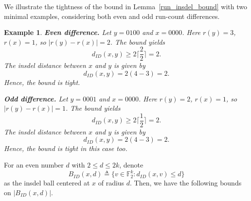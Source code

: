 \documentclass[11 pt]{article}
\numberwithin{equation}{section}
\newtheorem{example}[theorem]{Example}
\begin{document}
    We illustrate the tightness of the bound in Lemma~\ref{run_insdel_bound} with two minimal examples, considering both even and odd run-count differences.
    \begin{example}
    
       \noindent \textbf{Even difference.}  
        Let \(y = 0100\) and \(x = 0000\).  
        Here \(r(y) = 3\), \(r(x) = 1\), so \(|r(y)-r(x)| = 2\). The bound yields  
        \[
            d_{ID}(x,y) \ge 2\Big\lceil \frac{2}{2}\Big\rceil = 2.
        \]  
        The insdel distance between $x$ and $y$ is given by 
        \[
            d_{ID}(x,y) = 2(4-3) = 2.
        \]
        Hence, the bound is tight.

        \smallskip
        \noindent \textbf{Odd difference.}  
        Let \(y = 0001\) and \(x = 0000\).  
        Here \(r(y) = 2\), \(r(x) = 1\), so \(|r(y)-r(x)| = 1\). The bound yields  
        \[
            d_{ID}(x,y) \ge 2\Big\lceil \frac{1}{2}\Big\rceil = 2.
        \]  
        The insdel distance between $x$ and $y$ is given by 
        \[
            d_{ID}(x,y) = 2(4-3) = 2.
        \]
        Hence, the bound is tight in this case too.
    \end{example}
    
    
    \noindent 
        For an even number $d$ with $2 \le d \le 2k$, denote
        \[
        B_{ID}(x, d) \triangleq \{ v \in \mathbb{F}_2^k : d_{ID}(x, v) \le d \}
        \]
        as the insdel ball centered at $x$ of radius $d$. Then, we have the following bounds on $|B_{ID}(x, d)|$.
\end{document}

